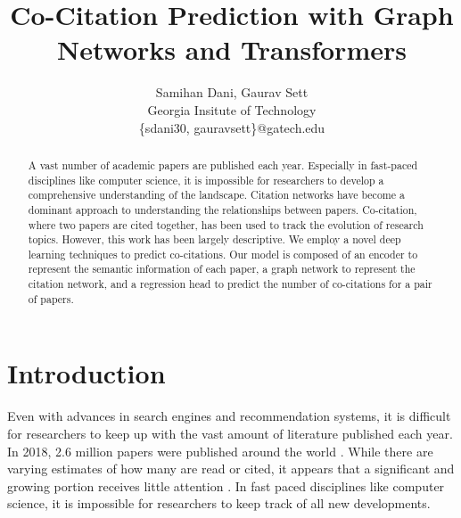 \documentclass[10pt,twocolumn,letterpaper]{article}
\begin{document}
\title{Co-Citation Prediction with Graph Networks and Transformers}

\author{Samihan Dani, Gaurav Sett\\
Georgia Insitute of Technology\\
\{sdani30, gauravsett\}@gatech.edu
}
\maketitle


\begin{abstract}
   A vast number of academic papers are published each year. Especially in fast-paced disciplines like computer science, it is impossible for researchers to develop a comprehensive understanding of the landscape. 
   Citation networks have become a dominant approach to understanding the relationships between papers. Co-citation, where two papers are cited together, has been used to track the evolution of research topics. However, this work has been largely descriptive.
   We employ a novel deep learning techniques to predict co-citations.
   Our model is composed of an encoder to represent the semantic information of each paper, a graph network to represent the citation network, and a regression head to predict the number of co-citations for a pair of papers.
\end{abstract}


\section{Introduction}
\label{sec:intro}

Even with advances in search engines and recommendation systems, it is difficult for researchers to keep up with the vast amount of literature published each year. In 2018, 2.6 million papers were published around the world \cite{white2019publications}. While there are varying estimates of how many are read or cited, it appears that a significant and growing portion receives little attention \cite{evans2008electronic}. In fast paced disciplines like computer science, it is impossible for researchers to keep track of all new developments. 
\end{document}
